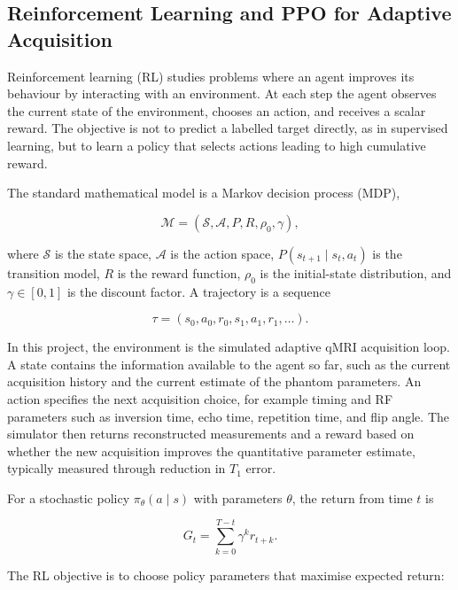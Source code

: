 \subsection{Reinforcement Learning and PPO for Adaptive Acquisition}
Reinforcement learning (RL) studies problems where an agent improves its
behaviour by interacting with an environment. At each step the agent observes
the current state of the environment, chooses an action, and receives a scalar
reward. The objective is not to predict a labelled target directly, as in
supervised learning, but to learn a policy that selects actions leading to high
cumulative reward.\cite{sutton_barto_rl_2018}

The standard mathematical model is a Markov decision process (MDP),

\begin{equation}
\mathcal{M} = (\mathcal{S}, \mathcal{A}, P, R, \rho_0, \gamma),
\end{equation}

where $\mathcal{S}$ is the state space, $\mathcal{A}$ is the action space,
$P(s_{t+1}\mid s_t,a_t)$ is the transition model, $R$ is the reward function,
$\rho_0$ is the initial-state distribution, and $\gamma \in [0,1]$ is the
discount factor. A trajectory is a sequence

\begin{equation}
\tau = (s_0, a_0, r_0, s_1, a_1, r_1, \ldots).
\end{equation}

In this project, the environment is the simulated adaptive qMRI acquisition
loop. A state contains the information available to the agent so far, such as
the current acquisition history and the current estimate of the phantom
parameters. An action specifies the next acquisition choice, for example timing
and RF parameters such as inversion time, echo time, repetition time, and flip
angle. The simulator then returns reconstructed measurements and a reward based
on whether the new acquisition improves the quantitative parameter estimate,
typically measured through reduction in $T_1$ error.

For a stochastic policy $\pi_\theta(a\mid s)$ with parameters $\theta$, the
return from time $t$ is

\begin{equation}
G_t = \sum_{k=0}^{T-t} \gamma^k r_{t+k}.
\end{equation}

The RL objective is to choose policy parameters that maximise expected return:


